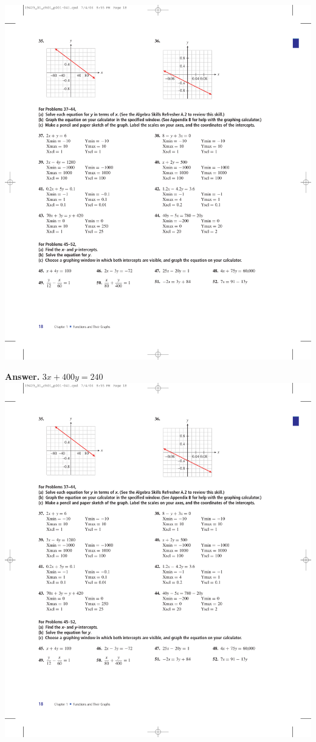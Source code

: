 \documentclass[10pt,]{book}
\theoremstyle{plain}
\theoremstyle{definition}
\theoremstyle{definition}
\theoremstyle{definition}
\numberwithin{equation}{part}
\begin{document}
\begin{exercisegroup}
\exercise[35.]\hypertarget{exercise-42}{}\includegraphics[width=0.8\linewidth]{images/fig-ex-1-1-35}
%
\par\smallskip
\noindent\textbf{Answer.}\hypertarget{answer-25}{}\quad
\(3x + 400y = 240\)%
\exercise[36.]\hypertarget{exercise-43}{}\includegraphics[width=0.8\linewidth]{images/fig-ex-1-1-36}
%
\end{exercisegroup}
\end{document}

